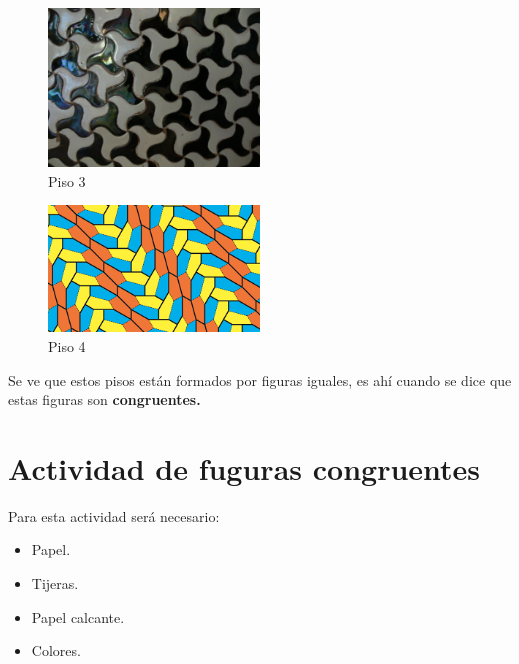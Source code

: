 \begin{figure}[H]
	\centering
	\includegraphics[width=0.5\textwidth]{Geometria/imgs/congruencia_piso_3.jpg}
	\caption{Piso 3}
	\label{congurncia.figura.3}
\end{figure}

\begin{figure}[H]
	\centering
	\includegraphics[width=0.5\textwidth]{Geometria/imgs/congruencia_piso_4.jpg}
	\caption{Piso 4}
	\label{congurncia.figura.4}
\end{figure}

Se ve que estos pisos están formados por figuras iguales, es ahí cuando se dice que estas figuras son \textbf{congruentes.}

\section*{Actividad de fuguras congruentes}\label{activ.construccion.figuras.congruentes}
Para esta actividad será necesario:

\begin{itemize}
	\item Papel.
	\item Tijeras.
	\item Papel calcante.
	\item Colores.
	
\end{itemize}

